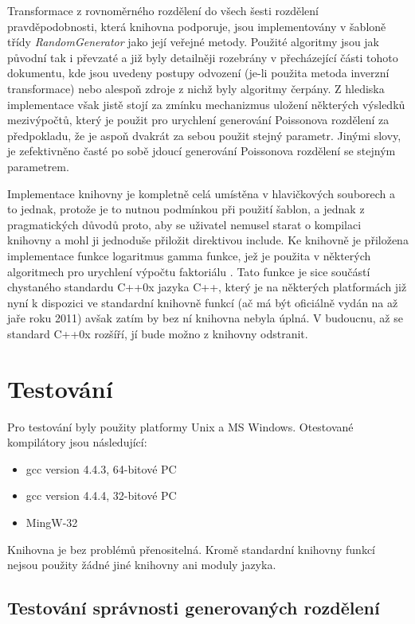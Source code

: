 \documentclass[a4paper,11pt]{article}
\begin{document}
Transformace z rovnoměrného rozdělení do všech šesti rozdělení pravděpodobnosti, která knihovna podporuje, jsou implementovány v šabloně třídy \emph{RandomGenerator} jako její veřejné metody. Použité algoritmy jsou jak původní tak i převzaté a již byly detailněji rozebrány v přecházející části tohoto dokumentu, kde jsou uvedeny postupy odvození (je-li použita metoda inverzní transformace) nebo alespoň zdroje z nichž byly algoritmy čerpány. Z hlediska implementace však jistě stojí za zmínku mechanizmus uložení některých výsledků mezivýpočtů, který je použit pro urychlení generování Poissonova rozdělení za předpokladu, že je aspoň dvakrát za sebou použit stejný parametr. Jinými slovy, je zefektivněno časté po sobě jdoucí generování Poissonova rozdělení se stejným parametrem.

Implementace knihovny je kompletně celá umístěna v hlavičkových souborech a to jednak, protože je to nutnou podmínkou při použití šablon, a jednak z pragmatických důvodů proto, aby se uživatel nemusel starat o kompilaci knihovny a mohl ji jednoduše přiložit direktivou include. Ke knihovně je přiložena implementace funkce logaritmus gamma funkce, jež je použita v některých algoritmech pro urychlení výpočtu faktoriálu \cite{NR}. Tato funkce je sice součástí chystaného standardu C++0x jazyka C++, který je na některých platformách již nyní k dispozici ve standardní knihovně funkcí (ač má být oficiálně vydán na až jaře roku 2011) avšak zatím by bez ní knihovna nebyla úplná. V budoucnu, až se standard C++0x rozšíří, jí bude možno z knihovny odstranit.

\section{Testování}
Pro testování byly použity platformy Unix a MS Windows. Otestované kompilátory jsou následující:
\begin{itemize}
\item gcc version 4.4.3, 64-bitové PC
\item gcc version 4.4.4, 32-bitové PC
\item MingW-32
\end{itemize}

Knihovna je bez problémů přenositelná. Kromě standardní knihovny funkcí nejsou použity žádné jiné knihovny ani moduly jazyka.

\subsection{Testování správnosti generovaných rozdělení}
\end{document}
